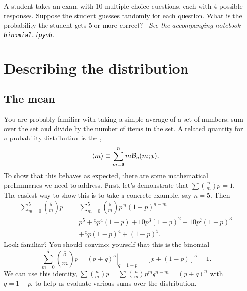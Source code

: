 \begin{exercisebox}
A student takes an exam with 10 multiple choice questions, each with 4 possible responses.  Suppose the student guesses randomly for each question.  What is the probability the student gets 5 or more correct? \notebook\ \emph{See the accompanying notebook \texttt{binomial.ipynb}.}
\end{exercisebox}

\section{Describing the distribution}
\subsection{The mean}

You are probably familiar with taking a simple average of a set of numbers: sum over the set and divide by the number of items in the set.  A related quantity for a probability distribution is the ,
\begin{equation}\label{e.mean}
 \left\langle m\right\rangle \equiv \sum_{m=0}^{n} m\mathcal{B}_{n}(m;p).
\end{equation}
To show that this behaves as expected, there are some mathematical preliminaries we need to address.  First, let's demonstrate that $\sum\binom{n}{m}{p} = 1$.  The easiest way to show this is to take a concrete example, say $n=5$.  Then
\begin{eqnarray*} \sum_{m=0}^{5}\binom{5}{m}{p} &=& \sum_{m=0}^{5}{5\choose m}p^{m}(1-p)^{n-m}\\
	&=&	p^{5}+5p^{4}(1-p)+10p^{3}(1-p)^{2}+10p^{2}(1-p)^{3}\\
	&& +5p(1-p)^{4}+(1-p)^{5}.
\end{eqnarray*}
Look familiar?  You should convince yourself that this is the binomial
\[ \sum_{m=0}^{5}\binom{5}{m}{p} = \left.\left(p+q\right)^{5}\right|_{q=1-p}
	= \left[p + \left(1-p\right)\right]^{5} = 1. \]
We can use this identity, $\sum\binom{n}{m}{p}=\sum{n\choose m}p^{m}q^{n-m} = (p+q)^{n}$ with $q=1-p$, to help us evaluate various sums over the distribution.

